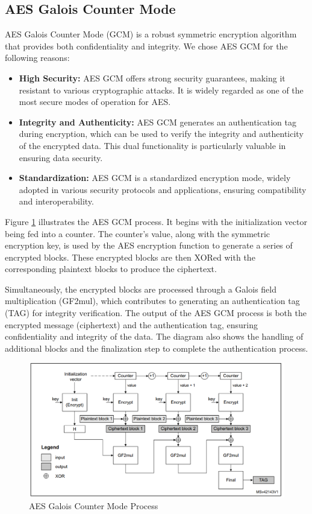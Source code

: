 \subsection{AES Galois Counter Mode}
AES Galois Counter Mode (GCM) is a robust symmetric encryption algorithm that provides both confidentiality and integrity. We chose AES GCM for the following reasons:

\begin{itemize}
    \item \textbf{High Security:} AES GCM offers strong security guarantees, making it resistant to various cryptographic attacks. It is widely regarded as one of the most secure modes of operation for AES.
    \item \textbf{Integrity and Authenticity:} AES GCM generates an authentication tag during encryption, which can be used to verify the integrity and authenticity of the encrypted data. This dual functionality is particularly valuable in ensuring data security.
    \item \textbf{Standardization:} AES GCM is a standardized encryption mode, widely adopted in various security protocols and applications, ensuring compatibility and interoperability.
\end{itemize}
Figure \ref{fig:aes_gcm} \cite{U5_Refman} illustrates the AES GCM process.
It begins with the initialization vector being fed into a counter. The counter's value, along with the symmetric encryption key, is used by the AES encryption function to generate a series of encrypted blocks. These encrypted blocks are then XORed with the corresponding plaintext blocks to produce the ciphertext.

Simultaneously, the encrypted blocks are processed through a Galois field multiplication (GF2mul), which contributes to generating an authentication tag (TAG) for integrity verification. The output of the AES GCM process is both the encrypted message (ciphertext) and the authentication tag, ensuring confidentiality and integrity of the data. The diagram also shows the handling of additional blocks and the finalization step to complete the authentication process.

\begin{figure}[H]
  \centering
  \includegraphics[width=17cm]{img/AES GCM.png}
  \caption{AES Galois Counter Mode Process }
  \label{fig:aes_gcm}
\end{figure}

